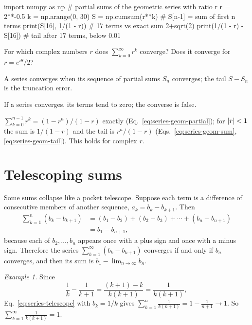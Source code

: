 \begin{pycode}
import numpy as np
# partial sums of the geometric series with ratio r
r = 2**-0.5
k = np.arange(0, 30)
S = np.cumsum(r**k)          # S[n-1] = sum of first n terms
print(S[16], 1/(1 - r))       # 17 terms vs exact sum 2+sqrt(2)
print(1/(1 - r) - S[16])      # tail after 17 terms, below 0.01
\end{pycode}

\begin{checkpoint}
For which complex numbers $r$ does $\sum_{k=0}^\infty r^k$ converge? Does it converge for $r=e^{i\theta}/2$?
\end{checkpoint}

\begin{keyideas}
\item A series converges when its sequence of partial sums $S_n$ converges; the tail $S-S_n$ is the truncation error.
\item If a series converges, its terms tend to zero; the converse is false.
\item $\sum_{k=0}^{n-1}r^k=(1-r^n)/(1-r)$ exactly (Eq.~\eqref{eq:series-geom-partial}); for $\left\lvert r\right\rvert<1$ the sum is $1/(1-r)$ and the tail is $r^n/(1-r)$ (Eqs.~\eqref{eq:series-geom-sum}, \eqref{eq:series-geom-tail}). This holds for complex $r$.
\end{keyideas}

\section{Telescoping sums}\label{sec:series-telescoping}

Some sums collapse like a pocket telescope. Suppose each term is a difference of consecutive members of another sequence, $a_k=b_k-b_{k+1}$. Then
\begin{align}
\sum_{k=1}^{n}(b_k-b_{k+1})
&=(b_1-b_2)+(b_2-b_3)+\cdots+(b_n-b_{n+1})\nonumber\\
&=b_1-b_{n+1},
\label{eq:series-telescope}
\end{align}
because each of $b_2,\dots,b_n$ appears once with a plus sign and once with a minus sign. Therefore the series $\sum_{k=1}^\infty(b_k-b_{k+1})$ converges if and only if $b_n$ converges, and then its sum is $b_1-\lim_{n\to\infty}b_n$.

\emph{Example 1.} Since
\[
\frac1k-\frac1{k+1}=\frac{(k+1)-k}{k(k+1)}=\frac{1}{k(k+1)},
\]
Eq.~\eqref{eq:series-telescope} with $b_k=1/k$ gives $\sum_{k=1}^n\frac{1}{k(k+1)}=1-\frac1{n+1}\to1$. So $\sum_{k=1}^\infty\frac{1}{k(k+1)}=1$.

